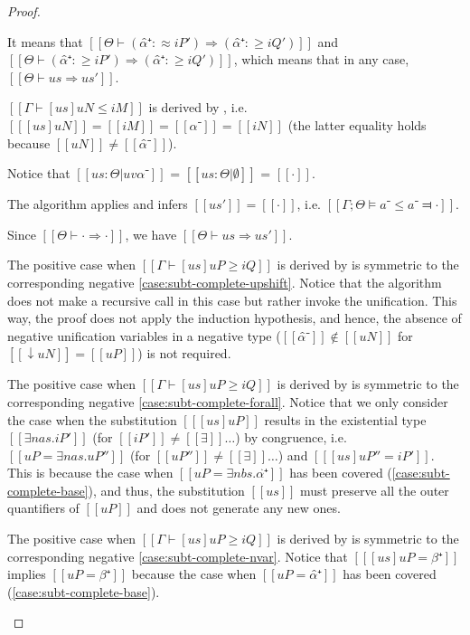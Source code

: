 \begin{proof}
\begin{caseof}
        It means that $[[Θ ⊢ (α̂⁺ :≈ iP') ⇒ (α̂⁺ :≥ iQ') ]]$ and 
        $[[ Θ ⊢ (α̂⁺ :≥ iP') ⇒ (α̂⁺ :≥ iQ') ]]$, which means that in any case, 
        $[[ Θ ⊢ us ⇒ us']]$.

        \item \label{case:subt-complete-nvar}
        $[[ Γ ⊢ [us]uN ≤ iM ]]$ is derived by , 
        i.e. $[[ [us]uN ]] = [[iM]] = [[ α⁻ ]] = [[iN]]$ 
        (the latter equality holds because $[[uN]] \neq [[α̂⁻]]$).

        Notice that $[[us : Θ | uv α⁻]]$ = $[[us : Θ | ∅]]$ = $[[·]]$.

        The algorithm applies  and 
        infers $[[us']] = [[·]]$, i.e. $[[Γ;Θ ⊨ a⁻ ≤ a⁻ ⫤ ·]]$.

        Since $[[Θ ⊢ · ⇒ ·]]$, we have $[[Θ ⊢ us ⇒ us']]$.

       \item The positive case when $[[Γ ⊢ [us]uP ≥ iQ]]$ is derived by 
        is symmetric to the corresponding negative
        \cref{case:subt-complete-upshift}. Notice that the algorithm does not 
        make a recursive call in this case but rather invoke the unification.
        This way, the proof does not apply the induction hypothesis, and hence, 
        the absence of negative unification variables in a negative type
        ($[[α̂⁻]] \notin [[uN]]$ for $[[↓uN]] =[[uP]]$) is not required.



      \item The positive case when $[[Γ ⊢ [us]uP ≥ iQ]]$ is derived by 
       is symmetric to the corresponding negative
      \cref{case:subt-complete-forall}. Notice that we only consider the case
      when the substitution $[[ [us]uP ]]$ results in the existential type 
      $[[∃nas.iP']]$ (for $[[iP']] \neq [[∃]]\dots$) by congruence, 
      i.e. $[[uP = ∃nas.uP'']]$ (for $[[uP'']] \neq [[∃]]\dots$) and $[[ [us]uP'' = iP' ]]$.
      This is because the case when $[[uP = ∃nbs.α̂⁺]]$ has been covered
      (\cref{case:subt-complete-base}), and thus, the substitution $[[us]]$ must
      preserve all the outer quantifiers of $[[uP]]$ and does not generate any new ones.

      \item The positive case when $[[Γ ⊢ [us]uP ≥ iQ]]$ is derived by 
       is symmetric to the corresponding negative
      \cref{case:subt-complete-nvar}.
      Notice that $[[ [us]uP = β⁺ ]]$ 
      implies $[[uP = β⁺]]$ because the case when $[[uP = α̂⁺]]$ has been covered 
      (\cref{case:subt-complete-base}).


    \end{caseof}
\end{proof}


